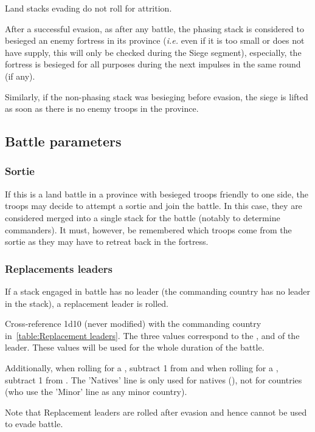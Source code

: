 Land stacks evading do not roll for attrition.

After a successful evasion, as after any battle, the phasing stack is
considered to besieged an enemy fortress in its province (\emph{i.e.} even if
it is too small or does not have supply, this will only be checked during the
Siege segment), especially, the fortress is besieged for all purposes during
the next impulses in the same round (if any).

Similarly, if the non-phasing stack was besieging before evasion, the siege is
lifted as soon as there is no enemy troops in the province.

\subsection{Battle parameters}
\label{chMilitary:Battle:Parameters}
\subsubsection{Sortie}
If this is a land battle in a province with besieged troops friendly to one
side, the troops may decide to attempt a sortie and join the battle. In this
case, they are considered merged into a single stack for the battle (notably
to determine commanders). It must, however, be remembered which troops come
from the sortie as they may have to retreat back in the fortress.

\subsubsection{Replacements leaders}
If a stack engaged in battle has no leader (the commanding country has no
leader in the stack), a replacement leader is rolled.


Cross-reference 1d10 (never modified) with the commanding country
in~\ref{table:Replacement leaders}. The three values correspond to the \Man,
\Fire and \Shock of the leader. These values will be used for the whole
duration of the battle.

Additionally, when rolling for a \POL \LeaderA, subtract 1 from \Man and when
rolling for a \PRU \LeaderA, subtract 1 from \Fire. The 'Natives' line is only
used for natives (), not for \ROTW countries (who use the
'Minor' line as any minor country).

Note that Replacement leaders are rolled after evasion and hence cannot be
used to evade battle.

